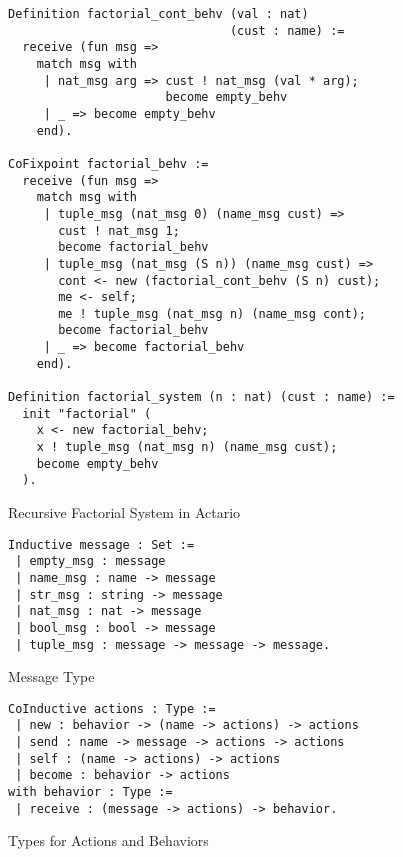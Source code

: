 \begin{figure}[t]
\begin{lstlisting}[style=small]
Definition factorial_cont_behv (val : nat)
                               (cust : name) :=
  receive (fun msg =>
    match msg with
     | nat_msg arg => cust ! nat_msg (val * arg);
                      become empty_behv
     | _ => become empty_behv
    end).

CoFixpoint factorial_behv :=
  receive (fun msg =>
    match msg with
     | tuple_msg (nat_msg 0) (name_msg cust) =>
       cust ! nat_msg 1;
       become factorial_behv
     | tuple_msg (nat_msg (S n)) (name_msg cust) =>
       cont <- new (factorial_cont_behv (S n) cust);
       me <- self;
       me ! tuple_msg (nat_msg n) (name_msg cont);
       become factorial_behv
     | _ => become factorial_behv
    end).

Definition factorial_system (n : nat) (cust : name) :=
  init "factorial" (
    x <- new factorial_behv;
    x ! tuple_msg (nat_msg n) (name_msg cust);
    become empty_behv
  ).
\end{lstlisting}
\caption{Recursive Factorial System in Actario}\label{coq:fact}
\end{figure}



\begin{figure}
\begin{lstlisting}
Inductive message : Set :=
 | empty_msg : message
 | name_msg : name -> message
 | str_msg : string -> message
 | nat_msg : nat -> message
 | bool_msg : bool -> message
 | tuple_msg : message -> message -> message.
\end{lstlisting}
\caption{Message Type}\label{coq:message}
\end{figure}

\begin{figure}
\begin{lstlisting}
CoInductive actions : Type :=
 | new : behavior -> (name -> actions) -> actions
 | send : name -> message -> actions -> actions
 | self : (name -> actions) -> actions
 | become : behavior -> actions
with behavior : Type :=
 | receive : (message -> actions) -> behavior.
\end{lstlisting}
\caption{Types for Actions and Behaviors}\label{coq:actions}
\end{figure}

